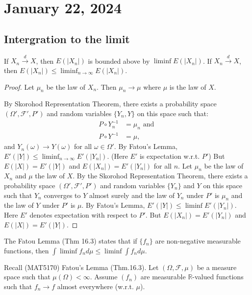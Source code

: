 \newpage
\section{January 22, 2024}
\subsection{Intergration to the limit}
\begin{theorem}[25.11]
If \( X_n \xrightarrow{d} X \), then \( E(|X_n|) \) is bounded above by \( \liminf E(|X_n|) \). If \( X_n \xrightarrow{d} X \), then \( E(|X_n|) \leq \liminf_{n \to \infty} E(|X_n|) \).
\end{theorem}

\begin{proof}
Let \( \mu_n \) be the law of \( X_n \). Then \( \mu_n \rightarrow \mu \) where \( \mu \) is the law of \( X \).

By Skorohod Representation Theorem, there exists a probability space \( (\Omega', \mathcal{F}', P') \) and random variables \( \{Y_n, Y\} \) on this space such that:
\begin{align*}
P \circ Y_n^{-1} &= \mu_n \text{ and } \\
P \circ Y^{-1} &= \mu,
\end{align*}
and \( Y_n(\omega) \rightarrow Y(\omega) \) for all \( \omega \in \Omega' \).
By Fatou's Lemma, \( E'(|Y|) \leq \liminf_{n \to \infty} E'(|Y_n|) \). (Here \( E' \) is expectation w.r.t. \( P' \))
But \( E(|X|) = E'(|Y|) \) and \( E(|X_n|) = E'(|Y_n|) \) for all \( n \).
Let \( \mu_n \) be the law of \( X_n \) and \( \mu \) the law of \( X \). By the Skorohod Representation Theorem, there exists a probability space \( (\Omega', \mathcal{F}', P') \) and random variables \( \{Y_n\} \) and \( Y \) on this space such that \( Y_n \) converges to \( Y \) almost surely and the law of \( Y_n \) under \( P' \) is \( \mu_n \) and the law of \( Y \) under \( P' \) is \( \mu \). By Fatou's Lemma, \( E'(|Y|) \leq \liminf E'(|Y_n|) \). Here \( E' \) denotes expectation with respect to \( P' \). But \( E(|X_n|) = E'(|Y_n|) \) and \( E(|X|) = E'(|Y|) \).
\end{proof}
\begin{moral}
The Fatou Lemma (Thm 16.3) states that if \( \{f_n\} \) are non-negative measurable functions, then \( \int \liminf f_n d\mu \leq \liminf \int f_n d\mu \).
\end{moral}


Recall (MAT5170) Fatou's Lemma (Thm.16.3). Let \((\Omega, \mathcal{F}, \mu)\) be a measure space such that \(\mu(\Omega) < \infty\). Assume \((f_n)\) are measurable \(\mathbb{R}\)-valued functions such that \(f_n \to f\) almost everywhere (w.r.t. \(\mu\)).

